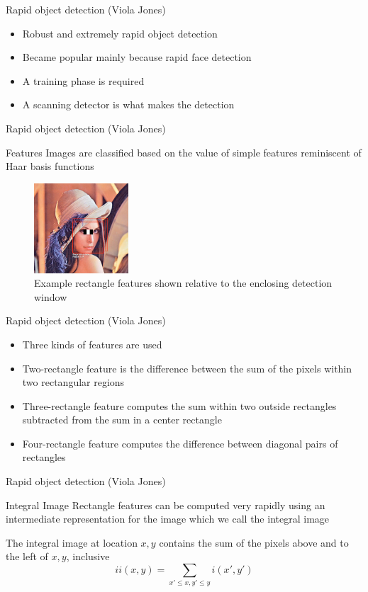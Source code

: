 \documentclass{beamer}
\begin{document}
\begin{frame}{Rapid object detection (Viola Jones)}
  \begin{itemize}
    \item Robust and extremely rapid object detection
    \item Became popular mainly because rapid face detection
    \item A training phase is required
    \item A scanning detector is what makes the detection
  \end{itemize}
\end{frame}
\begin{frame}{Rapid object detection (Viola Jones)}
  \begin{block}{Features}
      Images are classified based on the value of simple features reminiscent of Haar basis functions
  \end{block}
  \begin{figure}[!htb]
    \centering
    \includegraphics[width=100pt]{viola.png}
    \caption{Example rectangle features shown relative to the enclosing detection window}
    \label{figure:viola}
  \end{figure}
\end{frame}
\begin{frame}{Rapid object detection (Viola Jones)}
  \begin{itemize}
    \item Three kinds of features are used
    \item Two-rectangle feature is the difference between the sum of the pixels within two rectangular regions
    \item Three-rectangle feature computes the sum within two outside rectangles subtracted from the sum in a center rectangle
    \item Four-rectangle feature computes the difference between diagonal pairs of rectangles
  \end{itemize}
\end{frame}
\begin{frame}{Rapid object detection (Viola Jones)}
  \begin{block}{Integral Image}
      Rectangle features can be computed very rapidly using an intermediate representation for the image which we call the integral image
  \end{block}
  The integral image at location $x, y$ contains the sum of the pixels above and to the left of $x, y$, inclusive
  $$ii(x,y)=\sum_{x'\leq x,y'\leq y}{i(x',y')}$$
\end{frame}
\end{document}

